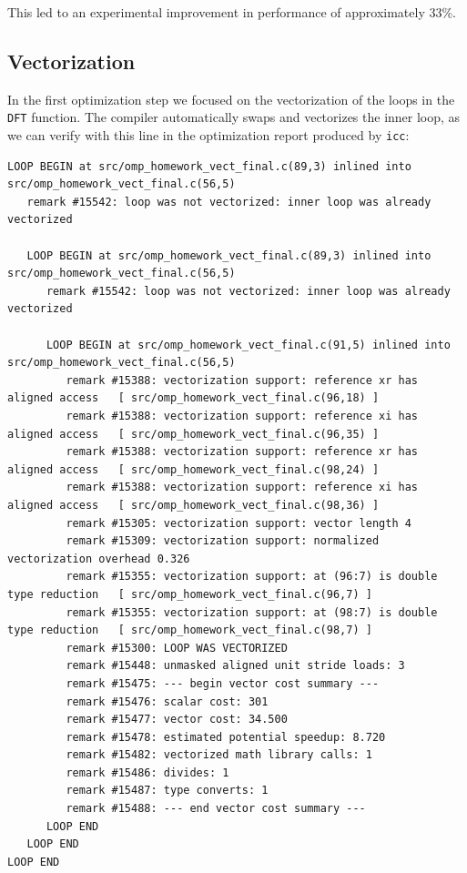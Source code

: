 \documentclass{article}
\begin{document}
This led to an experimental improvement in performance of approximately 33\%.

\subsection{Vectorization}

In the first optimization step we focused on the vectorization of the loops in the \verb|DFT| function. The compiler automatically swaps and vectorizes the inner loop, as we can verify with this line in the optimization report produced by \verb|icc|:
\begin{verbatim}
LOOP BEGIN at src/omp_homework_vect_final.c(89,3) inlined into src/omp_homework_vect_final.c(56,5)
   remark #15542: loop was not vectorized: inner loop was already vectorized

   LOOP BEGIN at src/omp_homework_vect_final.c(89,3) inlined into src/omp_homework_vect_final.c(56,5)
      remark #15542: loop was not vectorized: inner loop was already vectorized

      LOOP BEGIN at src/omp_homework_vect_final.c(91,5) inlined into src/omp_homework_vect_final.c(56,5)
         remark #15388: vectorization support: reference xr has aligned access   [ src/omp_homework_vect_final.c(96,18) ]
         remark #15388: vectorization support: reference xi has aligned access   [ src/omp_homework_vect_final.c(96,35) ]
         remark #15388: vectorization support: reference xr has aligned access   [ src/omp_homework_vect_final.c(98,24) ]
         remark #15388: vectorization support: reference xi has aligned access   [ src/omp_homework_vect_final.c(98,36) ]
         remark #15305: vectorization support: vector length 4
         remark #15309: vectorization support: normalized vectorization overhead 0.326
         remark #15355: vectorization support: at (96:7) is double type reduction   [ src/omp_homework_vect_final.c(96,7) ]
         remark #15355: vectorization support: at (98:7) is double type reduction   [ src/omp_homework_vect_final.c(98,7) ]
         remark #15300: LOOP WAS VECTORIZED
         remark #15448: unmasked aligned unit stride loads: 3 
         remark #15475: --- begin vector cost summary ---
         remark #15476: scalar cost: 301 
         remark #15477: vector cost: 34.500 
         remark #15478: estimated potential speedup: 8.720 
         remark #15482: vectorized math library calls: 1 
         remark #15486: divides: 1 
         remark #15487: type converts: 1 
         remark #15488: --- end vector cost summary ---
      LOOP END
   LOOP END
LOOP END
\end{verbatim}
\end{document}
